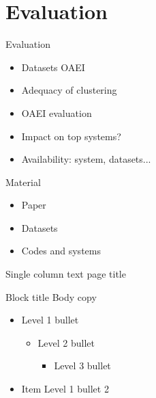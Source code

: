 \documentclass[t]{beamer}
\begin{document}
\section{Evaluation}


\begin{frame}{Evaluation}
	
  		\begin{itemize}    
  			\item Datasets OAEI
  			\item Adequacy of clustering
  			\item OAEI evaluation
  			\item Impact on top systems?
  			\item Availability: system, datasets...
		\end{itemize}
  	
\end{frame}



\begin{frame}{Material}
	
  		\begin{itemize}    
  			\item Paper
  			\item Datasets
  			\item Codes and systems
		\end{itemize}
  	
\end{frame}



\begin{frame}{Single column text page title}
	\begin{block}{Block title}
  		Body copy
  		\begin{itemize}    
  			\item Level 1 bullet
			\begin{itemize}
					\item Level 2 bullet
					\begin{itemize}
						\item Level 3 bullet
					\end{itemize}
			\end{itemize}
  			\item Item Level 1 bullet 2
  		\end{itemize}    
	\end{block}
\end{frame}
\end{document}
